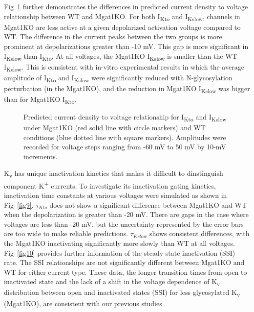 \documentclass[10pt,letterpaper]{article}
\begin{document}
Fig~\ref{fig8} further demonstrates the differences in predicted current density to voltage relationship between WT and Mgat1KO. For both I\textsubscript{Kto} and I\textsubscript{Kslow}, channels in Mgat1KO are less active at a given depolarized activation voltage compared to WT. The difference in the current peaks between the two groups is more prominent at depolarizations greater than -10 mV. This gap is more significant in I\textsubscript{Kslow} than I\textsubscript{Kto}. At all voltages, the Mgat1KO I\textsubscript{Kslow} is smaller than the WT I\textsubscript{Kslow}. This is consistent with in-vitro experimental results in which the average amplitude of I\textsubscript{Kto} and I\textsubscript{Kslow} were significantly reduced with N-glycosylation perturbation (in the Mgat1KO), and the reduction in Mgat1KO I\textsubscript{Kslow} was bigger than for Mgat1KO I\textsubscript{Kto}. 

\begin{figure}[!ht]
    \centering
    \caption{Predicted current density to voltage relationship for I\textsubscript{Kto} and I\textsubscript{Kslow} under Mgat1KO (red solid line with circle markers) and WT conditions (blue dotted line with square markers). Amplitudes were recorded for voltage steps ranging from -60 mV to 50 mV by 10-mV increments.} 
    \label{fig8}
\end{figure}

K\textsubscript{v} has unique inactivation kinetics that makes it difficult to dinstinguish component K\textsuperscript{+} currents. To investigate its inactivation gating kinetics, inactivation time constants at various voltages were simulated as shown in Fig~\ref{fig9}. $\tau_{Kto}$ does not show a significant difference between Mgat1KO and WT when the depolarization is greater than -20 mV. There are gaps in the case where voltages are less than -20 mV, but the uncertainty represented by the error bars are too wide to make reliable predictions. $\tau_{Kslow}$ shows consistent differences, with the Mgat1KO inactivating significantly more slowly than WT at all voltages. Fig~\ref{fig10} provides further information of the steady-state inactivation (SSI) rate. The SSI relationships are not significantly different between Mgat1KO and WT for either current type. These data, the longer transition times from open to inactivated state and the lack of a shift in the voltage dependence of K\textsubscript{v} distribution between open and inactivated states (SSI) for less glycosylated K\textsubscript{v} (Mgat1KO), are consistent with our previous studies \cite{schwetz2010n, ednie2015reduced, du2017}
\end{document}

